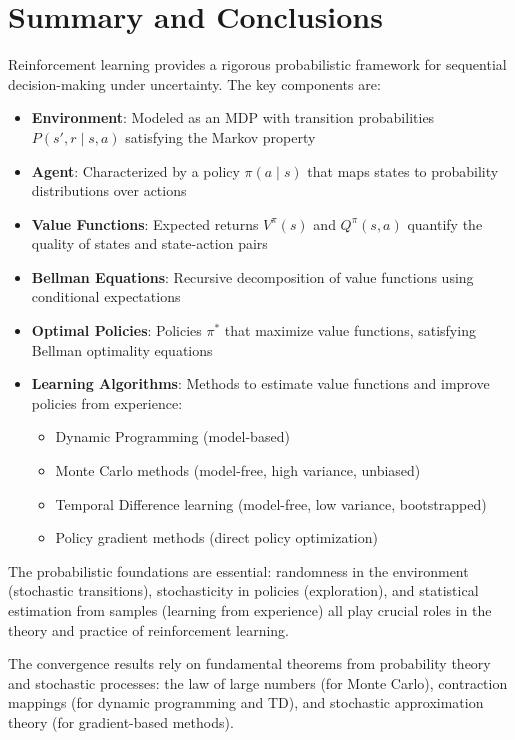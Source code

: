 \documentclass[a4paper, 11pt]{article}
\numberwithin{equation}{section}
\theoremstyle{plain}
\theoremstyle{definition}
\newcommand{\1}{{\mathbbm 1}}
\begin{document}
	\section{Summary and Conclusions}
	
	Reinforcement learning provides a rigorous probabilistic framework for sequential decision-making under uncertainty. The key components are:
	
	\begin{itemize}
		\item \textbf{Environment}: Modeled as an MDP with transition probabilities $P(s', r\;|\; s, a)$ satisfying the Markov property
		\item \textbf{Agent}: Characterized by a policy $\pi(a\;|\; s)$ that maps states to probability distributions over actions
		\item \textbf{Value Functions}: Expected returns $V^{\pi}(s)$ and $Q^{\pi}(s, a)$ quantify the quality of states and state-action pairs
		\item \textbf{Bellman Equations}: Recursive decomposition of value functions using conditional expectations
		\item \textbf{Optimal Policies}: Policies $\pi^*$ that maximize value functions, satisfying Bellman optimality equations
		\item \textbf{Learning Algorithms}: Methods to estimate value functions and improve policies from experience:
		\begin{itemize}
			\item Dynamic Programming (model-based)
			\item Monte Carlo methods (model-free, high variance, unbiased)
			\item Temporal Difference learning (model-free, low variance, bootstrapped)
			\item Policy gradient methods (direct policy optimization)
		\end{itemize}
	\end{itemize}
	
	The probabilistic foundations are essential: randomness in the environment (stochastic transitions), stochasticity in policies (exploration), and statistical estimation from samples (learning from experience) all play crucial roles in the theory and practice of reinforcement learning.
	
	The convergence results rely on fundamental theorems from probability theory and stochastic processes: the law of large numbers (for Monte Carlo), contraction mappings (for dynamic programming and TD), and stochastic approximation theory (for gradient-based methods).
	
\end{document}
